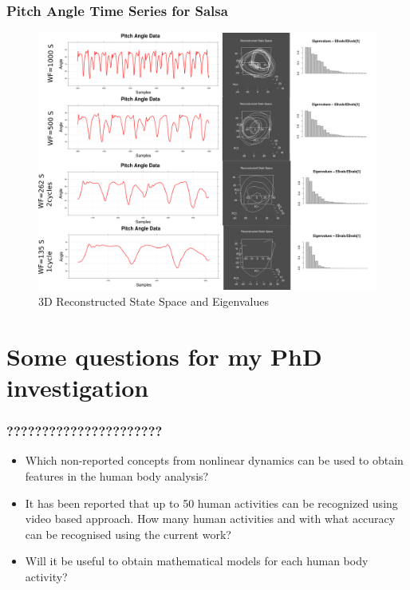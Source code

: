 \documentclass{beamer}
\theoremstyle{definition}
\begin{document}
\begin{frame}
\frametitle{Pitch Angle Time Series for Salsa}

\begin{figure}
\includegraphics[scale=0.129]{salsa}
\caption{3D Reconstructed State Space and Eigenvalues}
\end{figure}  
\end{frame}




\section{Some questions for my PhD investigation}

\begin{frame}
\frametitle{??????????????????????}

\begin{itemize}
 \item Which non-reported concepts from nonlinear dynamics 
 can be used to obtain features in the human body analysis?
 \item It has been reported that up to 50 human activities can be 
 recognized using video based approach. How many human activities
 and with what accuracy can be recognised using the current work?
 \item Will it be useful to obtain mathematical models for each 
 human body activity? 
\end{itemize}


\end{frame}
\end{document}
